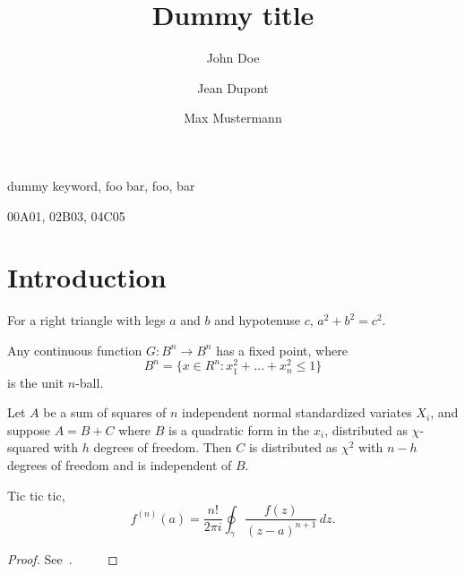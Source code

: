 \documentclass{etna}
\title{Dummy title}
\author{John Doe\footnotemark[1]
\and
Jean Dupont\footnotemark[1]
\and
Max Mustermann\footnotemark[2]
}
\begin{document}
\maketitle



\begin{abstract}
  \lipsum[1]
\end{abstract}

\begin{keywords}
   dummy keyword, foo bar, foo, bar
\end{keywords}

\begin{AMS}
  00A01, 02B03, 04C05
\end{AMS}

\section{Introduction}
\lipsum[2]

\begin{theorem}[Pythagoras]
For a right triangle with legs $a$ and $b$ and hypotenuse $c$,
$a^2+b^2=c^2$.
\end{theorem}
\begin{theorem}[Brouwer]
Any continuous function $G:B^n\to B^n$ has a fixed point, where
\[
  B^n=\{x \in R^n:x_1^2+\dots+x_n^2\le 1\}
 \]
is the unit $n$-ball.
\end{theorem}
\begin{theorem}[Fisher]
Let $A$ be a sum of squares of $n$ independent normal standardized variates
$X_i$, and suppose $A=B+C$ where $B$ is a quadratic form in the $x_i$,
distributed as $\chi$-squared with $h$ degrees of freedom. Then $C$ is
distributed as $\chi^2$ with $n-h$ degrees of freedom and is independent of
$B$.
\end{theorem}

\lipsum[3]

\begin{theorem}[Cauchy]\label{th:1}
  Tic tic tic,
  \begin{equation}\label{eq:1}
    f^{(n)}(a) = \frac{n!}{2\pi i} \oint_\gamma \frac{f(z)}{(z-a)^{n+1}}\, dz.
  \end{equation}
\end{theorem}
\begin{proof}
See~\cite{MR2882785}. $\qquad$
\end{proof}
\end{document}
